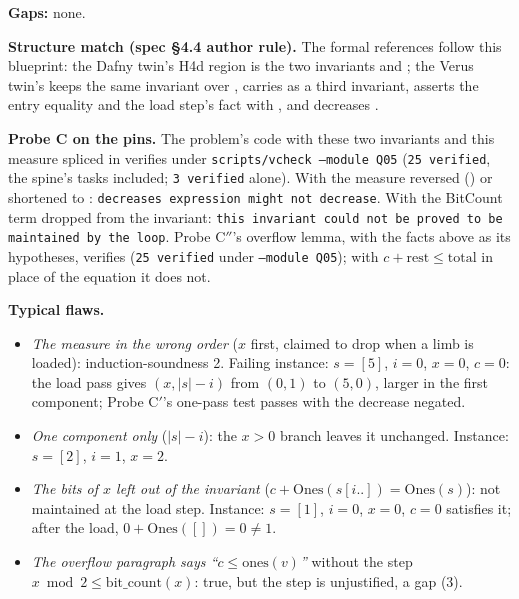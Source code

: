 \documentclass[11pt]{article}
\begin{document}
\textbf{Gaps:} none.

\textbf{Structure match (spec \S4.4 author rule).} The formal references
follow this blueprint: the Dafny twin's H4d region is the two invariants and
; the Verus twin's  keeps the same
invariant over , carries
 as a third invariant, asserts the entry equality
and the load step's  fact with \vrs{=~=}, and decreases
.

\textbf{Probe C on the pins.} The problem's code with these two invariants and
this measure spliced in verifies under \texttt{scripts/vcheck --module Q05}
(\texttt{25 verified}, the spine's tasks included; \texttt{3 verified} alone).
With the measure reversed () or shortened to
: \texttt{decreases expression might not decrease}.
With the BitCount term dropped from the invariant: \texttt{this invariant
could not be proved to be maintained by the loop}. Probe C$''$'s overflow lemma,
with the facts above as its hypotheses, verifies (\texttt{25 verified} under
\texttt{--module Q05}); with $c + \mathrm{rest} \leq \mathrm{total}$ in place of
the equation it does not.

\textbf{Typical flaws.}
\begin{itemize}
\item \emph{The measure in the wrong order} ($x$ first, claimed to drop when a
  limb is loaded): induction-soundness 2. Failing instance: $s = [5]$,
  $i = 0$, $x = 0$, $c = 0$: the load pass gives $(x, |s| - i)$ from $(0, 1)$
  to $(5, 0)$, larger in the first component; Probe C$'$'s one-pass test passes
  with the decrease negated.
\item \emph{One component only} ($|s| - i$): the $x > 0$ branch leaves it
  unchanged. Instance: $s = [2]$, $i = 1$, $x = 2$.
\item \emph{The bits of $x$ left out of the invariant}
  ($c + \mathrm{Ones}(s[i..]) = \mathrm{Ones}(s)$): not maintained at the load
  step. Instance: $s = [1]$, $i = 0$, $x = 0$, $c = 0$ satisfies it; after the
  load, $0 + \mathrm{Ones}([]) = 0 \neq 1$.
\item \emph{The overflow paragraph says ``$c \leq \mathrm{ones}(v)$''} without
  the step $x \bmod 2 \leq \mathrm{bit\_count}(x)$: true, but the step is
  unjustified, a gap (3).
\end{itemize}

\end{document}
